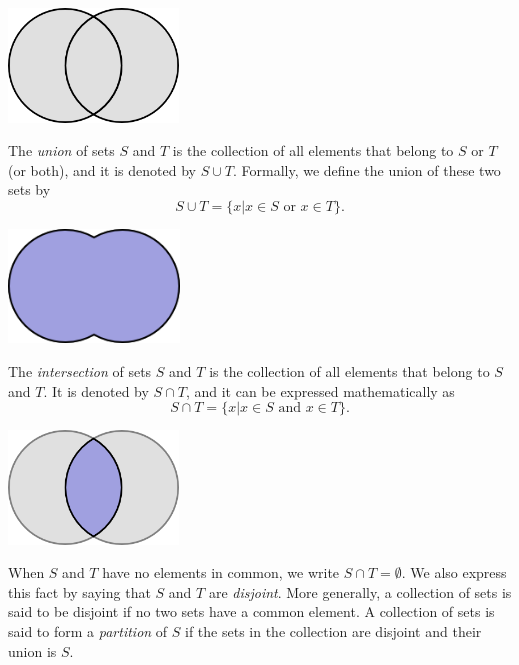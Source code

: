 \begin{center}
\includegraphics[height=3.03cm]{Figures/1Chapter/sets}
\end{center}

The \emph{union} of sets $S$ and $T$ is the collection of all elements that belong to $S$ or $T$ (or both), and it is denoted by $S \cup T$.
Formally, we define the union of these two sets by
\begin{equation*}
S \cup T = \{ x | x \in S \text{ or } x \in T \} .
\end{equation*}

\begin{center}
\includegraphics[height=3.03cm]{Figures/1Chapter/union}
\end{center}

The \emph{intersection} of sets $S$ and $T$ is the collection of all elements that belong to $S$ and $T$.
It is denoted by $S \cap T$, and it can be expressed mathematically as
\begin{equation*}
S \cap T = \{ x | x \in S \text{ and } x \in T \} .
\end{equation*}

\begin{center}
\includegraphics[height=3.03cm]{Figures/1Chapter/intersection}
\end{center}

When $S$ and $T$ have no elements in common, we write $S \cap T = \emptyset$.
We also express this fact by saying that $S$ and $T$ are \emph{disjoint}.
More generally, a collection of sets is said to be disjoint if no two sets have a common element.
A collection of sets is said to form a \emph{partition} of $S$ if the sets in the collection are disjoint and their union is $S$.

